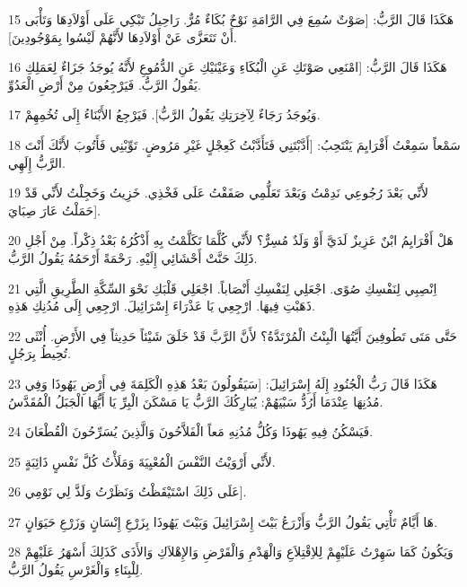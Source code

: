 \par 15 هَكَذَا قَالَ الرَّبُّ: [صَوْتٌ سُمِعَ فِي الرَّامَةِ نَوْحٌ بُكَاءٌ مُرٌّ. رَاحِيلُ تَبْكِي عَلَى أَوْلاَدِهَا وَتَأْبَى أَنْ تَتَعَزَّى عَنْ أَوْلاَدِهَا لأَنَّهُمْ لَيْسُوا بِمَوْجُودِينَ].
\par 16 هَكَذَا قَالَ الرَّبُّ: [امْنَعِي صَوْتَكِ عَنِ الْبُكَاءِ وَعَيْنَيْكِ عَنِ الدُّمُوعِ لأَنَّهُ يُوجَدُ جَزَاءٌ لِعَمَلِكِ يَقُولُ الرَّبُّ. فَيَرْجِعُونَ مِنْ أَرْضِ الْعَدُوِّ.
\par 17 وَيُوجَدُ رَجَاءٌ لِآخِرَتِكِ يَقُولُ الرَّبُّ]. فَيَرْجِعُ الأَبْنَاءُ إِلَى تُخُمِهِمْ.
\par 18 سَمْعاً سَمِعْتُ أَفْرَايِمَ يَنْتَحِبُ: [أَدَّبْتَنِي فَتَأَدَّبْتُ كَعِجْلٍ غَيْرِ مَرُوضٍ. تَوِّبْنِي فَأَتُوبَ لأَنَّكَ أَنْتَ الرَّبُّ إِلَهِي.
\par 19 لأَنِّي بَعْدَ رُجُوعِي نَدِمْتُ وَبَعْدَ تَعَلُّمِي صَفَقْتُ عَلَى فَخْذِي. خَزِيتُ وَخَجِلْتُ لأَنِّي قَدْ حَمَلْتُ عَارَ صِبَايَ].
\par 20 هَلْ أَفْرَايِمُ ابْنٌ عَزِيزٌ لَدَيَّ أَوْ وَلَدٌ مُسِرٌّ؟ لأَنِّي كُلَّمَا تَكَلَّمْتُ بِهِ أَذْكُرُهُ بَعْدُ ذِكْراً. مِنْ أَجْلِ ذَلِكَ حَنَّتْ أَحْشَائِي إِلَيْهِ. رَحْمَةً أَرْحَمُهُ يَقُولُ الرَّبُّ.
\par 21 اِنْصِبِي لِنَفْسِكِ صُوًى. اجْعَلِي لِنَفْسِكِ أَنْصَاباً. اجْعَلِي قَلْبَكِ نَحْوَ السِّكَّةِ الطَّرِيقِ الَّتِي ذَهَبْتِ فِيهَا. ارْجِعِي يَا عَذْرَاءَ إِسْرَائِيلَ. ارْجِعِي إِلَى مُدُنِكِ هَذِهِ.
\par 22 حَتَّى مَتَى تَطُوفِينَ أَيَّتُهَا الْبِنْتُ الْمُرْتَدَّةُ؟ لأَنَّ الرَّبَّ قَدْ خَلَقَ شَيْئاً حَدِيثاً فِي الأَرْضِ. أُنْثَى تُحِيطُ بِرَجُلٍ.
\par 23 هَكَذَا قَالَ رَبُّ الْجُنُودِ إِلَهُ إِسْرَائِيلَ: [سَيَقُولُونَ بَعْدُ هَذِهِ الْكَلِمَةَ فِي أَرْضِ يَهُوذَا وَفِي مُدُنِهَا عِنْدَمَا أَرُدُّ سَبْيَهُمْ: يُبَارِكُكَ الرَّبُّ يَا مَسْكَنَ الْبِرِّ يَا أَيُّهَا الْجَبَلُ الْمُقَدَّسُ.
\par 24 فَيَسْكُنُ فِيهِ يَهُوذَا وَكُلُّ مُدُنِهِ مَعاً الْفَلاَّحُونَ وَالَّذِينَ يُسَرِّحُونَ الْقُطْعَانَ.
\par 25 لأَنِّي أَرْوَيْتُ النَّفْسَ الْمُعْيِيَةَ وَمَلَأْتُ كُلَّ نَفْسٍ ذَائِبَةٍ.
\par 26 عَلَى ذَلِكَ اسْتَيْقَظْتُ وَنَظَرْتُ وَلَذَّ لِي نَوْمِي].
\par 27 هَا أَيَّامٌ تَأْتِي يَقُولُ الرَّبُّ وَأَزْرَعُ بَيْتَ إِسْرَائِيلَ وَبَيْتَ يَهُوذَا بِزَرْعِ إِنْسَانٍ وَزَرْعِ حَيَوَانٍ.
\par 28 وَيَكُونُ كَمَا سَهِرْتُ عَلَيْهِمْ لِلاِقْتِلاَعِ وَالْهَدْمِ وَالْقَرْضِ وَالإِهْلاَكِ وَالأَذَى كَذَلِكَ أَسْهَرُ عَلَيْهِمْ لِلْبِنَاءِ وَالْغَرْسِ يَقُولُ الرَّبُّ.

